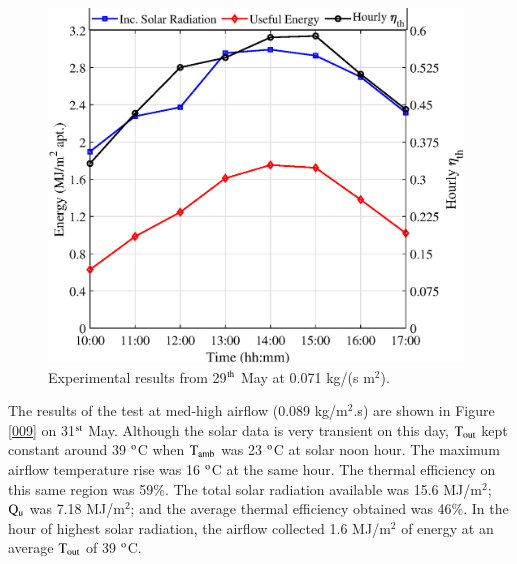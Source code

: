 \begin{figure}[!ht]
\begin{minipage}{0.49\textwidth}
		\includegraphics[width=0.98\textwidth]{figs/007-2.eps} %
	\end{minipage}
	
	\caption{Experimental results from 29$^{\rm{th}}$ May at 0.071 kg/(s m$^2$).}
	\label{007}
\end{figure}

The results of the test at med-high airflow (0.089 kg/m$^2$.s) are shown in Figure \ref{009} on 31$^{\rm{st}}$ May. Although the solar data is very transient on this day, $\rm{T_{out}}$ kept constant around 39 $^{\rm{o}}$C  when $\rm{T_{amb}}$ was 23 $^{\rm{o}}$C at solar noon hour. The maximum airflow temperature rise was 16 $^{\rm{o}}$C at the same hour. The thermal efficiency on this same region was 59\%. The total solar radiation available was 15.6 MJ/m$^2$; $\rm{Q_{u}}$ was 7.18 MJ/m$^2$; and the average thermal efficiency obtained was 46\%. In the hour of highest solar radiation, the airflow collected 1.6 MJ/m$^2$ of energy at an average $\rm{T_{out}}$ of 39 $^{\rm{o}}$C.


